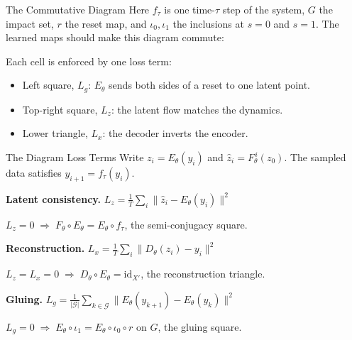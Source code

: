 \documentclass[10pt,aspectratio=169]{beamer}
\newcommand{\Enc}{E_\theta}
\newcommand{\Dec}{D_\theta}
\newcommand{\Dyn}{F_\theta}
\newcommand{\Lat}{Z}
\newcommand{\Xr}{X'}
\begin{document}
\begin{frame}[fragile]{The Commutative Diagram}
  Here \(f_\tau\) is one time-\(\tau\) step of the system, \(G\) the impact
  set, \(r\) the reset map, and \(\iota_0, \iota_1\) the inclusions at
  \(s = 0\) and \(s = 1\). The learned maps should make this diagram commute:

  \vspace{0.3em}
  \begin{center}
  \small
  \end{center}

  \vspace{0.2em}
  \normalsize
  Each cell is enforced by one loss term:
  \begin{itemize}
    \item Left square, \(L_g\): \(E_\theta\) sends both sides of a reset to one latent point.
    \item Top-right square, \(L_z\): the latent flow matches the dynamics.
    \item Lower triangle, \(L_x\): the decoder inverts the encoder.
  \end{itemize}
\end{frame}

\begin{frame}{The Diagram Loss Terms}
  \small
  Write \(z_i = E_\theta(y_i)\) and \(\widehat z_i = F_\theta^{\,i}(z_0)\). The
  sampled data satisfies \(y_{i+1} = f_\tau(y_i)\).

  \medskip
  \textbf{Latent consistency.}\quad
  \(\displaystyle L_z = \frac{1}{T}\sum_i \lVert \widehat z_i - E_\theta(y_i)\rVert^2\)

  \(L_z = 0 \;\Rightarrow\; F_\theta \circ E_\theta = E_\theta \circ f_\tau\),
  the semi-conjugacy square.

  \medskip
  \textbf{Reconstruction.}\quad
  \(\displaystyle L_x = \frac{1}{T}\sum_i \lVert D_\theta(\widehat z_i) - y_i\rVert^2\)

  \(L_z = L_x = 0 \;\Rightarrow\; D_\theta \circ E_\theta = \mathrm{id}_{X'}\),
  the reconstruction triangle.

  \medskip
  \textbf{Gluing.}\quad
  \(\displaystyle L_g = \frac{1}{|\mathcal{G}|}\sum_{k\in\mathcal{G}}
    \lVert E_\theta(y_{k+1}) - E_\theta(y_k)\rVert^2\)

  \(L_g = 0 \;\Rightarrow\; E_\theta\circ\iota_1 = E_\theta\circ\iota_0\circ r\)
  on \(G\), the gluing square.
\end{frame}
\end{document}
